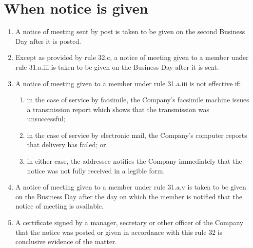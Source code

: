 \section{When notice is given}

\begin{enumerate}[label=(\alph*)]
    \item A notice of meeting sent by post is taken to be given on the second Business Day after it is posted.
    
    \item Except as provided by rule 32.c, a notice of meeting given to a member under rule 31.a.iii is taken to be given on the Business Day after it is sent.
    
    \item A notice of meeting given to a member under rule 31.a.iii is not effective if:
    \begin{enumerate}[label=(\roman*)]
        \item in the case of service by facsimile, the Company's facsimile machine issues a transmission report which shows that the transmission was unsuccessful;
        \item in the case of service by electronic mail, the Company's computer reports that delivery has failed; or
        \item in either case, the addressee notifies the Company immediately that the notice was not fully received in a legible form.
    \end{enumerate}
    
    \item A notice of meeting given to a member under rule 31.a.v is taken to be given on the Business Day after the day on which the member is notified that the notice of meeting is available.
    
    \item A certificate signed by a manager, secretary or other officer of the Company that the notice was posted or given in accordance with this rule 32 is conclusive evidence of the matter.
\end{enumerate} 